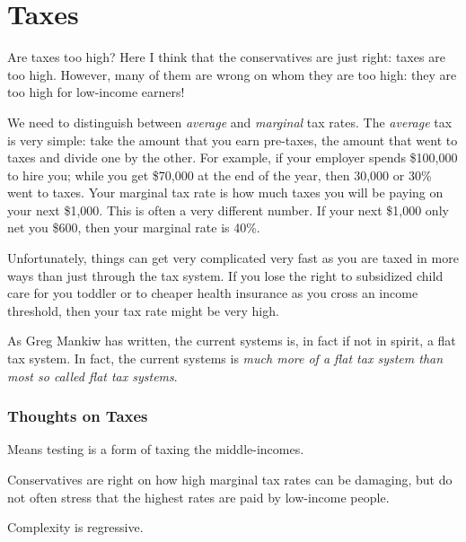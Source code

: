 \chapter{Taxes}%
\label{chpt:taxes}

Are taxes too high? Here I think that the conservatives are just right: taxes
are too high. However, many of them are wrong on whom they are too high: they
are too high for low-income earners!

We need to distinguish between \emph{average} and \emph{marginal} tax rates.
The \emph{average} tax is very simple: take the amount that you earn pre-taxes,
the amount that went to taxes and divide one by the other. For example, if your
employer spends \$100,000 to hire you; while you get \$70,000 at the end of the
year, then 30,000 or 30\% went to taxes. Your marginal tax rate is how much
taxes you will be paying on your next \$1,000. This is often a very different
number. If your next \$1,000 only net you \$600, then your marginal rate is
40\%. %

Unfortunately, things can get very complicated very fast as you are taxed in
more ways than just through the tax system. If you lose the right to subsidized
child care for you toddler or to cheaper health insurance as you cross an
income threshold, then your tax rate might be very high.

As Greg Mankiw has written, the current systems is, in fact if not in spirit, a
flat tax system. In fact, the current systems is \emph{much more of a flat tax
system than most so called flat tax systems}.

\subsection{Thoughts on Taxes}

\thought Means testing is a form of taxing the middle-incomes.

\thought Conservatives are right on how high marginal tax rates can be
damaging, but do not often stress that the highest rates are paid by low-income
people.

\thought Complexity is regressive.

